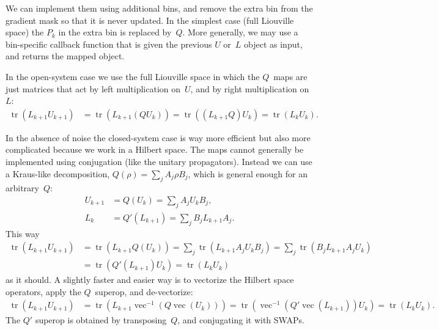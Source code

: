 \documentclass[aps, pra, a4paper, longbibliography, superscriptaddress]{revtex4-1}
\newcommand{\inprod}[2]{\left\langle #1, #2 \right\rangle}
\DeclareMathOperator{\tr}{tr}
\DeclareMathOperator{\cvec}{vec}
\begin{document}
We can implement them using additional bins, and remove the extra bin from the gradient mask so that it is never updated.
In the simplest case (full Liouville space) the $P_k$ in the extra bin is replaced by~$Q$. More generally, we may
use a bin-specific callback function that is given the previous $U$ or~$L$ object as input,
and returns the mapped object.

In the open-system case we use the full Liouville space in which the $Q$~maps are just matrices
that act by left multiplication on~$U$, and by right multiplication on~$L$:
\begin{align*}
\tr(L_{k+1} U_{k+1})
&= \tr(L_{k+1} (Q U_{k}))
= \tr((L_{k+1} Q) U_{k})
= \tr(L_{k} U_{k}).
\end{align*}


In the absence of noise the closed-system case is way more efficient but also more complicated because we work in a Hilbert space.
The maps cannot generally be implemented using conjugation (like the unitary propagators).
Instead we can use a Kraus-like decomposition, $Q(\rho) = \sum_j A_j \rho B_j$,
which is general enough for an arbitrary~$Q$:
\begin{align}
U_{k+1} &= Q(U_k) = \sum_j A_j U_k B_j,\\
L_{k} &= Q'(L_{k+1}) = \sum_j B_j L_{k+1} A_j.
\end{align}
This way
\begin{align*}
\tr(L_{k+1} U_{k+1})
&= \tr(L_{k+1} Q(U_k))
= \sum_j \tr(L_{k+1} A_j U_k B_j)
= \sum_j \tr(B_j L_{k+1} A_j U_k)\\
&= \tr(Q'(L_{k+1}) U_k)
= \tr(L_{k} U_{k})
\end{align*}
as it should.
A slightly faster and easier way is to vectorize the Hilbert space operators, apply the $Q$~superop, and de-vectorize:
\begin{align*}
\tr(L_{k+1} U_{k+1})
&= \tr(L_{k+1} \cvec^{-1}(Q \cvec(U_{k})))
= \tr(\cvec^{-1}(Q' \cvec(L_{k+1})) U_{k})
= \tr(L_{k} U_{k}).
\end{align*}
The $Q'$ superop is obtained by transposing~$Q$, and conjugating it with SWAPs.
\end{document}
